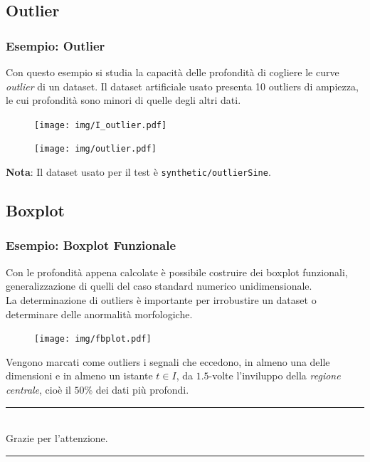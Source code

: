 \documentclass[9pt]{beamer}
\begin{document}

\subsection{Outlier}

\begin{frame}
 \frametitle{Esempio: Outlier}
Con questo esempio si studia la capacit\`a delle profondit\`a di cogliere le curve \emph{outlier} di un dataset.
Il dataset artificiale usato presenta 10 outliers di ampiezza, le cui profondit\`a sono minori di quelle degli altri dati.

\begin{figure}
 \begin{minipage}{0.4\textwidth}
  \centering
  \texttt{[image: img/I\_outlier.pdf]}
 \end{minipage}
\hspace{0.3cm}
  \begin{minipage}{0.55\textwidth}
   \centering
  \texttt{[image: img/outlier.pdf]}
  \end{minipage}
\end{figure}

\textbf{Nota}:
Il dataset usato per il test \`e \texttt{synthetic/outlierSine}.



\end{frame}


\subsection{Boxplot}

\begin{frame}
\frametitle{Esempio: Boxplot Funzionale}
Con le profondit\`a appena calcolate \`e possibile costruire dei boxplot funzionali, generalizzazione di quelli del caso standard numerico unidimensionale.\\
La determinazione di outliers \`e importante per irrobustire un dataset o determinare delle anormalit\`a morfologiche.

\begin{figure}
 \centering
\texttt{[image: img/fbplot.pdf]}
\end{figure}
Vengono marcati come outliers i segnali che eccedono, in almeno una delle dimensioni e in almeno un istante $t \in I$, da $1.5$-volte l'inviluppo della \emph{regione centrale}, cio\`e il
$50\%$ dei dati pi\`u profondi.

\end{frame}
\begin{frame}

\begin{center}
\rule{5cm}{2pt}\\
\Large Grazie per l'attenzione.\\
\rule{5cm}{2pt}\\
\end{center}
 
\end{frame}


\end{document}
